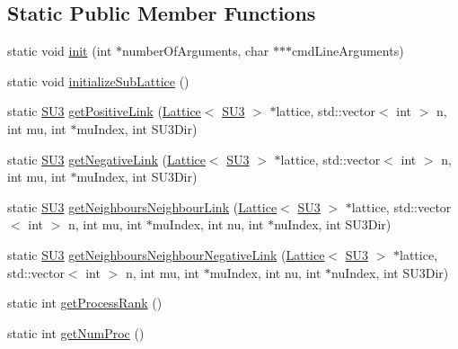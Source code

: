 \subsection*{Static Public Member Functions}
\begin{DoxyCompactItemize}
\item 
static void \mbox{\hyperlink{class_parallel_1_1_communicator_adc9248c5a0defbbf55bfca988bfd9e96}{init}} (int $\ast$number\+Of\+Arguments, char $\ast$$\ast$$\ast$cmd\+Line\+Arguments)
\item 
static void \mbox{\hyperlink{class_parallel_1_1_communicator_a71baca622b377e6537799857be416a77}{initialize\+Sub\+Lattice}} ()
\item 
static \mbox{\hyperlink{class_s_u3}{S\+U3}} \mbox{\hyperlink{class_parallel_1_1_communicator_ae715d67d2e60def9bf529702a64f4caa}{get\+Positive\+Link}} (\mbox{\hyperlink{class_lattice}{Lattice}}$<$ \mbox{\hyperlink{class_s_u3}{S\+U3}} $>$ $\ast$lattice, std\+::vector$<$ int $>$ n, int mu, int $\ast$mu\+Index, int S\+U3\+Dir)
\item 
static \mbox{\hyperlink{class_s_u3}{S\+U3}} \mbox{\hyperlink{class_parallel_1_1_communicator_ad3b8781686b517c146d9d2f2dbf932de}{get\+Negative\+Link}} (\mbox{\hyperlink{class_lattice}{Lattice}}$<$ \mbox{\hyperlink{class_s_u3}{S\+U3}} $>$ $\ast$lattice, std\+::vector$<$ int $>$ n, int mu, int $\ast$mu\+Index, int S\+U3\+Dir)
\item 
static \mbox{\hyperlink{class_s_u3}{S\+U3}} \mbox{\hyperlink{class_parallel_1_1_communicator_a453ebde0502ed86b8bd95dede6f8e69c}{get\+Neighbours\+Neighbour\+Link}} (\mbox{\hyperlink{class_lattice}{Lattice}}$<$ \mbox{\hyperlink{class_s_u3}{S\+U3}} $>$ $\ast$lattice, std\+::vector$<$ int $>$ n, int mu, int $\ast$mu\+Index, int nu, int $\ast$nu\+Index, int S\+U3\+Dir)
\item 
static \mbox{\hyperlink{class_s_u3}{S\+U3}} \mbox{\hyperlink{class_parallel_1_1_communicator_aebe919d44a02b37c98161ff4d3d23f6f}{get\+Neighbours\+Neighbour\+Negative\+Link}} (\mbox{\hyperlink{class_lattice}{Lattice}}$<$ \mbox{\hyperlink{class_s_u3}{S\+U3}} $>$ $\ast$lattice, std\+::vector$<$ int $>$ n, int mu, int $\ast$mu\+Index, int nu, int $\ast$nu\+Index, int S\+U3\+Dir)
\item 
static int \mbox{\hyperlink{class_parallel_1_1_communicator_a474ab433da0e83ef372d74e26a7e5cb0}{get\+Process\+Rank}} ()
\item 
static int \mbox{\hyperlink{class_parallel_1_1_communicator_a7b1f80fb49a0cc83f2031c3415174150}{get\+Num\+Proc}} ()
\item 

\end{DoxyCompactItemize}
